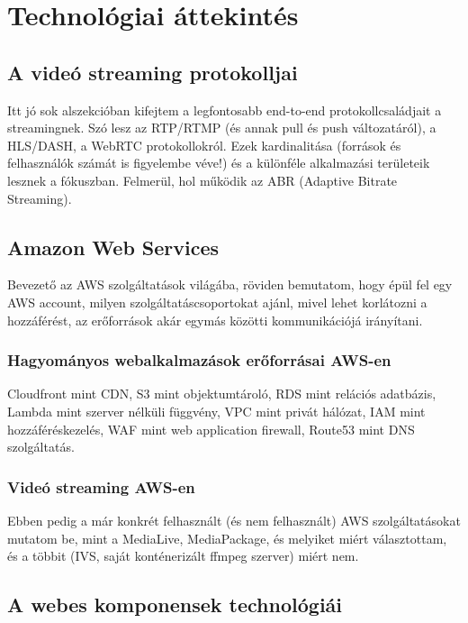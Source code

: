 \chapter{Technológiai áttekintés}

\section{A videó streaming protokolljai}

Itt jó sok alszekcióban kifejtem a legfontosabb end-to-end protokollcsaládjait a streamingnek. Szó lesz az RTP/RTMP (és annak pull és push változatáról), a HLS/DASH, a WebRTC protokollokról. Ezek kardinalitása (források és felhasználók számát is figyelembe véve!) és a különféle alkalmazási területeik lesznek a fókuszban. Felmerül, hol működik az ABR (Adaptive Bitrate Streaming).

\section{Amazon Web Services}

Bevezető az AWS szolgáltatások világába, röviden bemutatom, hogy épül fel egy AWS account, milyen szolgáltatáscsoportokat ajánl, mivel lehet korlátozni a hozzáférést, az erőforrások akár egymás közötti kommunikációjá irányítani.

\subsection{Hagyományos webalkalmazások erőforrásai AWS-en}

Cloudfront mint CDN, S3 mint objektumtároló, RDS mint relációs adatbázis, Lambda mint szerver nélküli függvény, VPC mint privát hálózat, IAM mint hozzáféréskezelés, WAF mint web application firewall, Route53 mint DNS szolgáltatás.

\subsection{Videó streaming AWS-en}

Ebben pedig a már konkrét felhasznált (és nem felhasznált) AWS szolgáltatásokat mutatom be, mint a MediaLive, MediaPackage, és melyiket miért választottam, és a többit (IVS, saját konténerizált ffmpeg szerver) miért nem.

\section{A webes komponensek technológiái}

